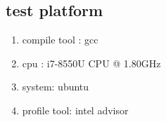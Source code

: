 \documentclass{article}
\begin{document}
\subsection{test platform}
\begin{enumerate}
\item compile tool : gcc
\item cpu : i7-8550U CPU @ 1.80GHz
\item system: ubuntu 
\item profile tool: intel advisor
\end{enumerate}
\end{document}

